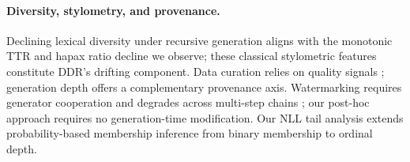 \paragraph{Diversity, stylometry, and provenance.}
 Declining lexical diversity under recursive generation \cite{curious_decline,writing_diversity} aligns with the monotonic TTR and hapax ratio decline we observe; these classical stylometric features \cite{stamatatos_survey} constitute DDR's drifting component.
Data curation relies on quality signals \cite{dsir,ccnet}; generation depth offers a complementary provenance axis.
Watermarking \cite{watermark_llm,synthid_text} requires generator cooperation and degrades across multi-step chains \cite{chainwash}; our post-hoc approach requires no generation-time modification.
Our NLL tail analysis extends probability-based membership inference \cite{min_k_percent,koike_mia_detection} from binary membership to ordinal depth.
